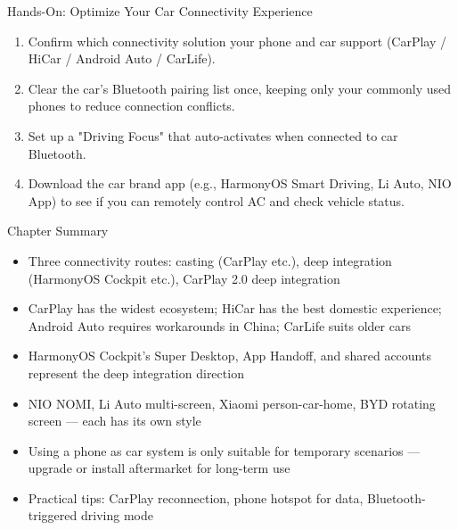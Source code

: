 \begin{tcbpractice}{Hands-On: Optimize Your Car Connectivity Experience}
\begin{enumerate}
  \item Confirm which connectivity solution your phone and car support (CarPlay / HiCar / Android Auto / CarLife).
  \item Clear the car's Bluetooth pairing list once, keeping only your commonly used phones to reduce connection conflicts.
  \item Set up a "Driving Focus" that auto-activates when connected to car Bluetooth.
  \item Download the car brand app (e.g., HarmonyOS Smart Driving, Li Auto, NIO App) to see if you can remotely control AC and check vehicle status.
\end{enumerate}

\end{tcbpractice}

\begin{tcbsummary}{Chapter Summary}
\begin{itemize}
  \item Three connectivity routes: casting (CarPlay etc.), deep integration (HarmonyOS Cockpit etc.), CarPlay 2.0 deep integration
  \item CarPlay has the widest ecosystem; HiCar has the best domestic experience; Android Auto requires workarounds in China; CarLife suits older cars
  \item HarmonyOS Cockpit's Super Desktop, App Handoff, and shared accounts represent the deep integration direction
  \item NIO NOMI, Li Auto multi-screen, Xiaomi person-car-home, BYD rotating screen — each has its own style
  \item Using a phone as car system is only suitable for temporary scenarios — upgrade or install aftermarket for long-term use
  \item Practical tips: CarPlay reconnection, phone hotspot for data, Bluetooth-triggered driving mode
\end{itemize}

\end{tcbsummary}
